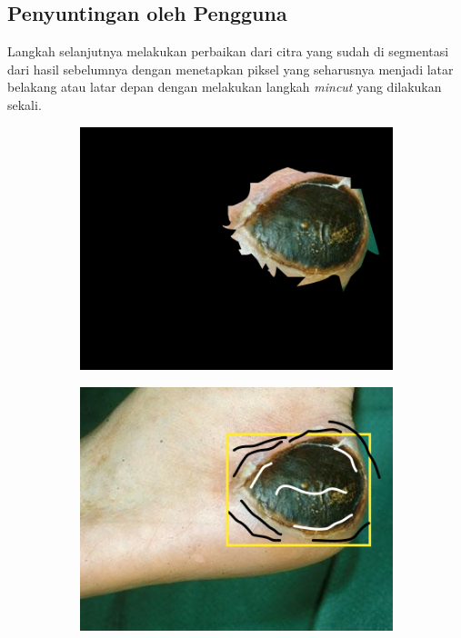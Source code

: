 \subsection{Penyuntingan oleh Pengguna}
Langkah selanjutnya melakukan perbaikan dari citra yang sudah di segmentasi
dari hasil sebelumnya dengan menetapkan piksel yang seharusnya menjadi latar belakang
atau latar depan dengan melakukan langkah \emph{mincut} yang dilakukan sekali.

\begin{figure}[H]
	\centering
      \begin{subfigure}{0.3\textwidth}
		\centering{}
		\includegraphics[width=\textwidth]{gambar/res_1.png}
		\caption{}
	  \end{subfigure}
      \begin{subfigure}{0.3\textwidth}
		\centering{}
		\includegraphics[width=\textwidth]{gambar/brush.png}

\end{subfigure}
\end{figure}
